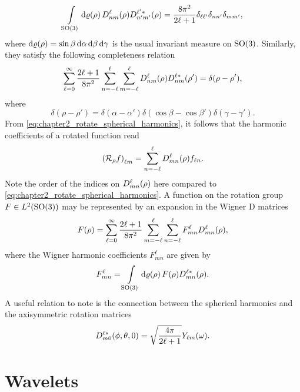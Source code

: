 %
\begin{equation}
	\integrateRotation{\rho} \wigner{\ell}{n}{m}(\rho) \wigner[\ast]{\ell'}{n'}{m'}(\rho)
	= \frac{8\pi^{2}}{2\ell+1} \delta_{\ell\ell'} \delta_{n n'} \delta_{mm'},
\end{equation}
%
where \(\rotationVolume = \sin{\beta}\dd{\alpha}\dd{\beta}\dd{\gamma}\) is the usual invariant measure on \(\rotationGroup{}\).
Similarly, they satisfy the following completeness relation
%
\begin{equation}
	\sum\limits_{\ell=0}^{\infty} \frac{2\ell+1}{8\pi^{2}} \wignerSum \sum\limits_{m=-\ell}^{\ell} \wigner{\ell}{n}{m}(\rho) \wigner[\ast]{\ell}{n}{m}(\rho')
	= \delta(\rho-\rho'),
\end{equation}
%
where
%
\begin{equation}
	\delta(\rho-\rho')
	= \delta(\alpha-\alpha') \delta(\cos{\beta} - \cos{\beta'}) \delta(\gamma-\gamma').
\end{equation}
%
From \cref{eq:chapter2_rotate_spherical_harmonics}, it follows that the harmonic coefficients of a rotated function read
%
\begin{equation}
	\harmonic{(\rotation{\rho}f)}
	= \wignerSum \wigner{\ell}{m}{n}(\rho) f_{\ell n}.
\end{equation}
%
Note the order of the indices on \(\wigner{\ell}{m}{n}(\rho)\) here compared to \cref{eq:chapter2_rotate_spherical_harmonics}.
A function on the rotation group \(F \in \hilbert{\rotationGroup}\) may be represented by an expansion in the Wigner D matrices
%
\begin{equation}
	F(\rho)
	= \sum\limits_{\ell=0}^{\infty} \frac{2\ell+1}{8\pi^{2}} \sum\limits_{m=-\ell}^{\ell} \wignerSum F^{\ell}_{m n} \wigner{\ell}{m}{n}(\rho),
\end{equation}
%
where the Wigner harmonic coefficients \(F^{\ell}_{m n}\) are given by
%
\begin{equation}
	F^{\ell}_{m n}
	= \integrateRotation{\rho} F(\rho) \wigner[\ast]{\ell}{m}{n}(\rho).
\end{equation}
%
A useful relation to note is the connection between the spherical harmonics and the axisymmetric rotation matrices
%
\begin{equation}
	\wigner[\ast]{\ell}{m}{0}(\phi,\theta,0)
	= \sqrt{\inverseFactor} \pixel{\harmonic{Y}}.
\end{equation}

\section{Wavelets}\label{sec:chapter2_wavelets}

